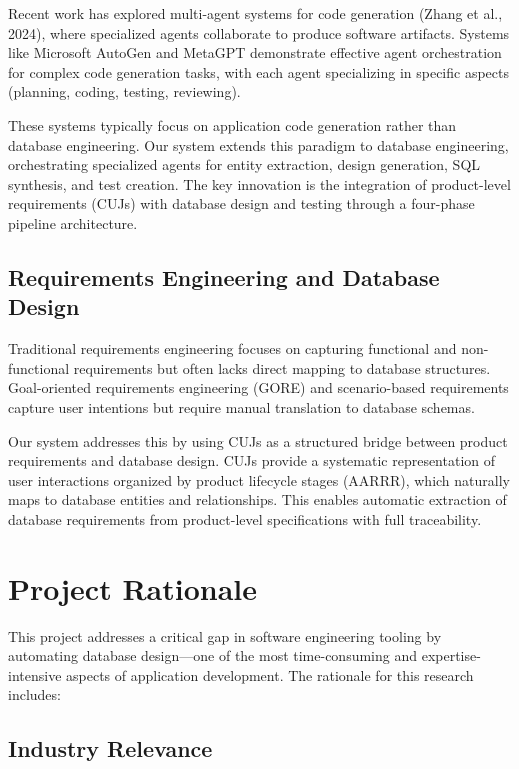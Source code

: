 \documentclass[12pt,a4paper]{article}
\begin{document}
Recent work has explored multi-agent systems for code generation (Zhang et al., 2024), where specialized agents collaborate to produce software artifacts. Systems like Microsoft AutoGen and MetaGPT demonstrate effective agent orchestration for complex code generation tasks, with each agent specializing in specific aspects (planning, coding, testing, reviewing).

These systems typically focus on application code generation rather than database engineering. Our system extends this paradigm to database engineering, orchestrating specialized agents for entity extraction, design generation, SQL synthesis, and test creation. The key innovation is the integration of product-level requirements (CUJs) with database design and testing through a four-phase pipeline architecture.

\subsection{Requirements Engineering and Database Design}

Traditional requirements engineering focuses on capturing functional and non-functional requirements but often lacks direct mapping to database structures. Goal-oriented requirements engineering (GORE) and scenario-based requirements capture user intentions but require manual translation to database schemas.

Our system addresses this by using CUJs as a structured bridge between product requirements and database design. CUJs provide a systematic representation of user interactions organized by product lifecycle stages (AARRR), which naturally maps to database entities and relationships. This enables automatic extraction of database requirements from product-level specifications with full traceability.

\section{Project Rationale}

This project addresses a critical gap in software engineering tooling by automating database design—one of the most time-consuming and expertise-intensive aspects of application development. The rationale for this research includes:

\subsection{Industry Relevance}
\end{document}
